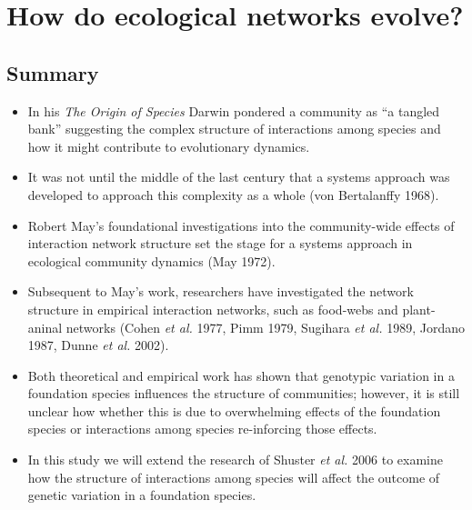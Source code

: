 \documentclass[12pt]{article}
\newcommand{\etal}{\textit{et al.} }
\begin{document}
\section{How do ecological networks evolve?}
\subsection{Summary}
  \begin{itemize}
  \item In his \textit{The Origin of Species} Darwin pondered a
    community as ``a tangled bank'' suggesting the complex structure
    of interactions among species and how it might contribute to
    evolutionary dynamics.
  \item It was not until the middle of the last century that
    a systems approach was developed to approach this complexity as a
    whole (von Bertalanffy 1968).
  \item Robert May's foundational investigations into the
    community-wide effects of interaction network structure set the
    stage for a systems approach in ecological community dynamics (May
    1972).
  \item Subsequent to May's work, researchers have investigated
    the network structure in empirical interaction networks, such as
    food-webs and plant-aninal networks (Cohen \etal 1977, Pimm 1979,
    Sugihara \etal 1989, Jordano 1987, Dunne \etal 2002).
  \item Both theoretical and empirical work has shown that genotypic
    variation in a foundation species influences the structure of
    communities; however, it is still unclear how whether this is due
    to overwhelming effects of the foundation species or interactions
    among species re-inforcing those effects.
  \item In this study we will extend the research of Shuster \etal
    2006 to examine how the structure of interactions among
    species will affect the outcome of genetic variation in a
    foundation species.
  \end{itemize}
\end{document}

